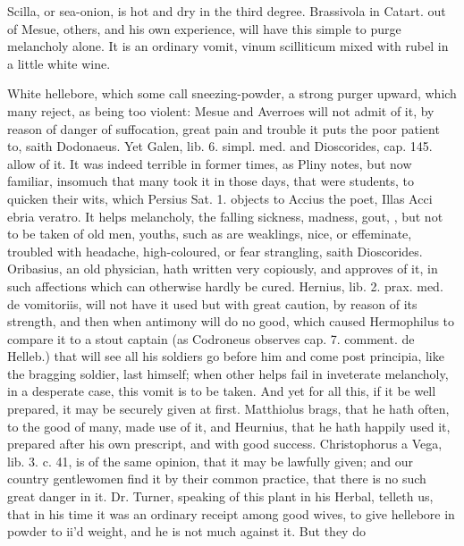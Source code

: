 {Scilla, or sea-onion, is hot and dry in the third degree. Brassivola in
Catart. out of Mesue, others, and his own experience, will have this
simple to purge melancholy alone. It is an ordinary vomit, vinum
scilliticum mixed with rubel in a little white wine.

White hellebore, which some call sneezing-powder, a strong purger
upward, which many reject, as being too violent: Mesue and Averroes
will not admit of it, by reason of danger of suffocation,
great pain and trouble it puts the poor patient to, saith
Dodonaeus. Yet Galen, lib. 6. simpl. med. and Dioscorides, cap. 145.
allow of it. It was indeed  terrible in former times, as Pliny
notes, but now familiar, insomuch that many took it in those days,
that were students, to quicken their wits, which Persius Sat. 1.
objects to Accius the poet, Illas Acci ebria veratro. It helps
melancholy, the falling sickness, madness, gout, \etc{}, but not to be
taken of old men, youths, such as are weaklings, nice, or effeminate,
troubled with headache, high-coloured, or fear strangling, saith
Dioscorides. Oribasius, an old physician, hath written very
copiously, and approves of it, in such affections which can otherwise
hardly be cured. Hernius, lib. 2. prax. med. de vomitoriis, will not
have it used but with great caution, by reason of its strength,
and then when antimony will do no good, which caused Hermophilus to
compare it to a stout captain (as Codroneus observes cap. 7. comment.
de Helleb.) that will see all his soldiers go before him and come post
principia, like the bragging soldier, last himself; when other
helps fail in inveterate melancholy, in a desperate case, this vomit is
to be taken. And yet for all this, if it be well prepared, it may be
 securely given at first. Matthiolus brags, that he hath
often, to the good of many, made use of it, and Heurnius, that he
hath happily used it, prepared after his own prescript, and with good
success. Christophorus a Vega, lib. 3. c. 41, is of the same opinion,
that it may be lawfully given; and our country gentlewomen find it by
their common practice, that there is no such great danger in it. Dr.
Turner, speaking of this plant in his Herbal, telleth us, that in his
time it was an ordinary receipt among good wives, to give hellebore in
powder to ii'd weight, and he is not much against it. But they do
}

